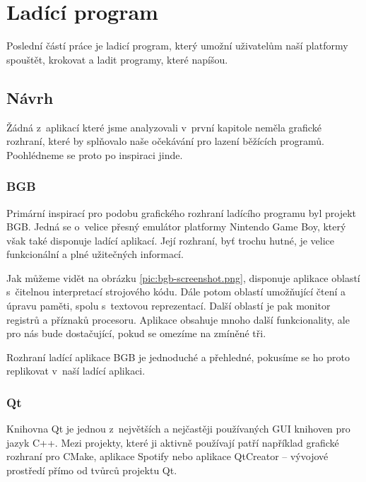 \chapter{Ladící program}
\label{chap:debugger}

Poslední částí práce je ladicí program, který umožní uživatelům naší platformy spouštět, krokovat a ladit programy, které napíšou.

\section{Návrh}

Žádná z~aplikací které jsme analyzovali v~první kapitole neměla grafické rozhraní, které by splňovalo naše očekávání pro lazení běžících programů. Poohlédneme se proto po inspiraci jinde.

\subsection{BGB}

Primární inspirací pro podobu grafického rozhraní ladícího programu byl projekt BGB. Jedná se o~velice přesný emulátor platformy Nintendo Game Boy\cite{bgb-website}, který však také disponuje ladící aplikací. Její rozhraní, byť trochu hutné, je velice funkcionální a plné užitečných informací.


Jak můžeme vidět na obrázku \ref{pic:bgb-screenshot.png}, disponuje aplikace oblastí s~čitelnou interpretací strojového kódu. Dále potom oblastí umožňující čtení a úpravu paměti, spolu s~textovou reprezentací. Další oblastí je pak monitor registrů a příznaků procesoru. Aplikace obsahuje mnoho další funkcionality, ale pro nás bude dostačující, pokud se omezíme na zmíněné tři.

Rozhraní ladící aplikace BGB je jednoduché a přehledné, pokusíme se ho proto replikovat v~naší ladící aplikaci.

\subsection{Qt}
\label{sec:dbg-qt}

Knihovna Qt je jednou z~největších a nejčastěji používaných GUI knihoven pro jazyk C++. Mezi projekty, které ji aktivně používají patří například grafické rozhraní pro CMake, aplikace Spotify nebo aplikace QtCreator\cite{qt-creator} -- vývojové prostředí přímo od tvůrců projektu Qt.

